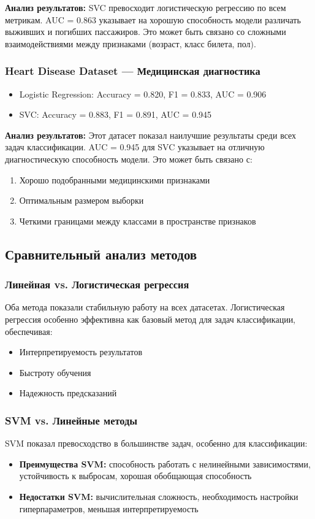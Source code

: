 \documentclass[a4paper]{article}
\begin{document}
\textbf{Анализ результатов:}
SVC превосходит логистическую регрессию по всем метрикам. AUC = 0.863 указывает на хорошую способность модели различать выживших и погибших пассажиров. Это может быть связано со сложными взаимодействиями между признаками (возраст, класс билета, пол).

\subsubsection{Heart Disease Dataset — Медицинская диагностика}

\begin{itemize}
    \item Logistic Regression: Accuracy = 0.820, F1 = 0.833, AUC = 0.906
    \item SVC: Accuracy = 0.883, F1 = 0.891, AUC = 0.945
\end{itemize}

\textbf{Анализ результатов:}
Этот датасет показал наилучшие результаты среди всех задач классификации. AUC = 0.945 для SVC указывает на отличную диагностическую способность модели. Это может быть связано с:
\begin{enumerate}
    \item Хорошо подобранными медицинскими признаками
    \item Оптимальным размером выборки
    \item Четкими границами между классами в пространстве признаков
\end{enumerate}

\subsection{Сравнительный анализ методов}

\subsubsection{Линейная vs. Логистическая регрессия}
Оба метода показали стабильную работу на всех датасетах. Логистическая регрессия особенно эффективна как базовый метод для задач классификации, обеспечивая:
\begin{itemize}
    \item Интерпретируемость результатов
    \item Быстроту обучения
    \item Надежность предсказаний
\end{itemize}

\subsubsection{SVM vs. Линейные методы}
SVM показал превосходство в большинстве задач, особенно для классификации:
\begin{itemize}
    \item \textbf{Преимущества SVM:} способность работать с нелинейными зависимостями, устойчивость к выбросам, хорошая обобщающая способность
    \item \textbf{Недостатки SVM:} вычислительная сложность, необходимость настройки гиперпараметров, меньшая интерпретируемость
\end{itemize}
\end{document}
